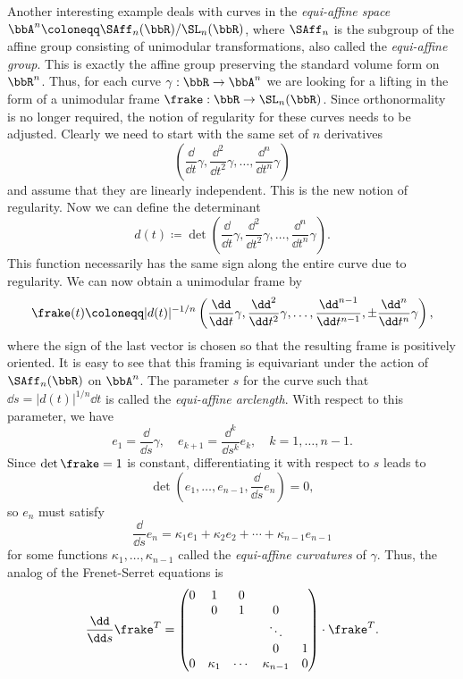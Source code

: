 \begin{example}
    Another interesting example deals with curves in the \emph{equi-affine space} $\bbA^n\coloneqq \SAff_n(\bbR)\slash\SL_n(\bbR)$, where $\SAff_n$ is the subgroup of the affine group consisting of unimodular transformations, also called the \emph{equi-affine group}. This is exactly the affine group preserving the standard volume form on $\bbR^n$. Thus, for each curve $\gamma:\bbR\to \bbA^n$ we are looking for a lifting in the form of a unimodular frame $\frake:\bbR\to \SL_n(\bbR)$. Since orthonormality is no longer required, the notion of regularity for these curves needs to be adjusted. Clearly we need to start with the same set of $n$ derivatives
    \[\left(\frac{\dd}{\dd t}\gamma,\frac{\dd^2}{\dd t^2}\gamma,\ldots,\frac{\dd^{n}}{\dd t^{n}}\gamma\right)\]
    and assume that they are linearly independent. This is the new notion of regularity. Now we can define the determinant
    \[d(t)\coloneqq \det\left(\frac{\dd}{\dd t}\gamma,\frac{\dd^2}{\dd t^2}\gamma,\ldots,\frac{\dd^{n}}{\dd t^{n}}\gamma\right).\]
    This function necessarily has the same sign along the entire curve due to regularity. We can now obtain a unimodular frame by 
    \[\frake(t)\coloneqq |d(t)|^{-1/n}\left(\frac{\dd}{\dd t}\gamma,\frac{\dd^2}{\dd t^2}\gamma,\ldots,\frac{\dd^{n-1}}{\dd t^{n-1}},\pm\frac{\dd^{n}}{\dd t^{n}}\gamma\right),\]
    where the sign of the last vector is chosen so that the resulting frame is positively oriented. It is easy to see that this framing is equivariant under the action of $\SAff_n(\bbR)$ on $\bbA^n$. The parameter $s$ for the curve such that $\dd s=|d(t)|^{1/n}\dd t$ is called the \emph{equi-affine arclength}. With respect to this parameter, we have 
    \[e_1=\frac{\dd}{\dd s}\gamma,\quad e_{k+1}=\frac{\dd^k}{\dd s^k} e_k,\quad k=1,\ldots,n-1.\]
    Since $\det\frake=1$ is constant, differentiating it with respect to $s$ leads to 
    \[\det\left(e_1,\ldots,e_{n-1},\frac{\dd}{\dd s}e_n\right)=0,\]
    so $e_n$ must satisfy 
    \[\frac{\dd}{\dd s}e_n=\kappa_1 e_1+\kappa_2 e_2+\cdots+\kappa_{n-1}e_{n-1}\]
    for some functions $\kappa_1,\ldots,\kappa_{n-1}$ called the \emph{equi-affine curvatures} of $\gamma$. Thus, the analog of the Frenet-Serret equations is 
    \[\frac{\dd}{\dd s} \frake^T=\begin{pmatrix}
        0 & 1 & 0 &  & \\
         & 0 & 1 & 0 &     \\
        & &  & \ddots & \\
         & & & 0 & 1\\
        0 & \kappa_1 & \cdots & \kappa_{n-1}& 0
    \end{pmatrix}\cdot\frake^T.\]
\end{example}


